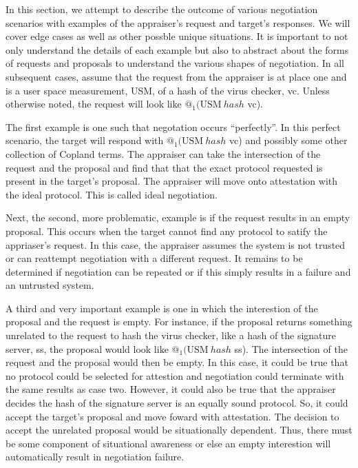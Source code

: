 \documentclass[sigconf,authordraft]{acmart}
\begin{document}
  
In this section, we attempt to describe the outcome of various negotiation scenarios
with examples of the appraiser's request and target's responses. We will cover edge cases as well as other possble
unique situations. It is important to not only understand the details of each example but also to abstract about the forms of requests and proposals to understand the various shapes of negotiation. In all subsequent cases, assume that the request from the appraiser is at place one and is a user space measurement, USM, of a hash of the virus checker, vc. Unless otherwise noted, the request will look like $@_1 (\text{USM}\: hash$ vc).

The first example is one such that negotation
occurs ``perfectly''. In this perfect
scenario, the target will respond with $@_1 (\text{USM}\: hash$ vc)
and possibly some other collection of Copland terms. The appraiser can take the intersection of the request and the proposal and find that 
that the exact protocol requested is present in the target's proposal. The appraiser will move onto attestation with the ideal protocol. This is called ideal negotiation.


Next, the second, more problematic, example is if the request results in an empty proposal. This occurs when the target cannot find any protocol to satify the appriaser's request. In this case, the appraiser assumes the system is not trusted or can reattempt negotiation with a different request. It remains to be determined if negotiation can be repeated or if this simply results in a failure and an untrusted system.

A third and very important example is one in which the interestion of the proposal and the request is empty. For instance, if the proposal returns something unrelated to the request to hash the virus checker, like a hash of the signature server, ss, the proposal would look like {{$@_1 (\text{USM}\: hash$ ss)}}. The intersection of the request and the proposal would then be empty. In this case, it could be true that no protocol could be selected for attestion and negotiation could terminate with the same results as case two. However, it could also be true that the appraiser decides the hash of the signature server is an equally sound protocol. So, it could accept the target's proposal and move foward with attestation. The decision to accept the unrelated proposal would be situationally dependent. Thus, there must be some component of situational awareness or else an empty interestion will automatically result in negotiation failure. 
\end{document}
